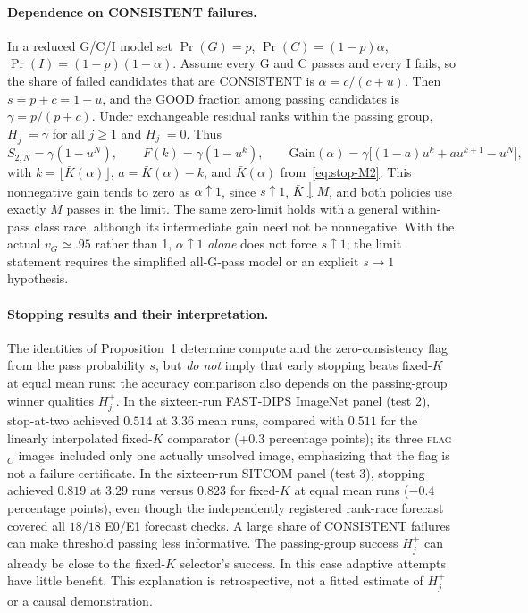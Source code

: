 \paragraph{Dependence on CONSISTENT failures.}
In a reduced G/C/I model set
$\Pr(G)=p$, $\Pr(C)=(1-p)\alpha$,
$\Pr(I)=(1-p)(1-\alpha)$. Assume every G and C passes and every I
fails, so the share of failed candidates that are CONSISTENT is
$\alpha=c/(c+u)$. Then
$s=p+c=1-u$, and the GOOD fraction among passing candidates is
$\gamma=p/(p+c)$. Under exchangeable residual ranks within the
passing group, $H_j^+=\gamma$ for all $j\ge1$ and $H_j^-=0$.
Thus
\begin{equation}\label{eq:protocol-consistent-share}
 S_{2,N}=\gamma(1-u^N),\qquad
 F(k)=\gamma(1-u^k),\qquad
 \mathrm{Gain}(\alpha)=\gamma\bigl[(1-a)u^k+a u^{k+1}-u^N\bigr],
\end{equation}
with $k=\lfloor\bar K(\alpha)\rfloor$, $a=\bar K(\alpha)-k$,
and $\bar K(\alpha)$ from~\eqref{eq:stop-M2}.
This nonnegative gain tends to zero as $\alpha\uparrow1$, since
$s\uparrow1$, $\bar K\downarrow M$, and both policies use exactly
$M$ passes in the limit. The same zero-limit holds with a general
within-pass class race, although its intermediate gain need not be
nonnegative. With the actual $v_G\simeq.95$ rather than 1,
$\alpha\uparrow1$ \emph{alone} does not force $s\uparrow1$;
the limit statement requires the simplified all-G-pass model or an
explicit $s\to1$ hypothesis.

\paragraph{Stopping results and their interpretation.}
The identities of Proposition~1 determine compute and the
zero-consistency flag from the pass probability $s$, but \emph{do
not} imply that early stopping beats fixed-$K$ at equal mean runs:
the accuracy comparison also depends on the passing-group winner
qualities $H_j^+$. In the sixteen-run FAST-DIPS ImageNet panel (test 2),
stop-at-two achieved $0.514$ at $3.36$ mean runs, compared with
$0.511$ for the linearly interpolated fixed-$K$ comparator
(+$0.3$ percentage points); its three \textsc{flag}$_C$ images
included only one actually unsolved image, emphasizing that the
flag is not a failure certificate. In the sixteen-run SITCOM panel (test 3), stopping achieved
$0.819$ at $3.29$ runs versus $0.823$ for fixed-$K$ at equal mean
runs ($-0.4$ percentage points), even though the independently registered
rank-race forecast covered all $18/18$ E0/E1 forecast checks.
A large share of CONSISTENT failures can make threshold passing
less informative. The passing-group success $H_j^+$ can already
be close to the fixed-$K$ selector's success. In this case
adaptive attempts have little benefit. This explanation is retrospective, not a fitted estimate of
$H_j^+$ or a causal demonstration.

